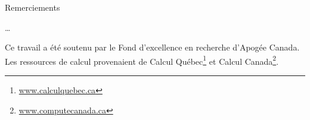 %
%

Remerciements

\ldots


Ce travail a été soutenu par le Fond d'excellence en recherche d'Apogée Canada. Les ressources de calcul provenaient de Calcul Québec\footnote{\href{www.calculquebec.ca}{www.calculquebec.ca}} et Calcul Canada\footnote{\href{www.computecanada.ca}{www.computecanada.ca}}.
